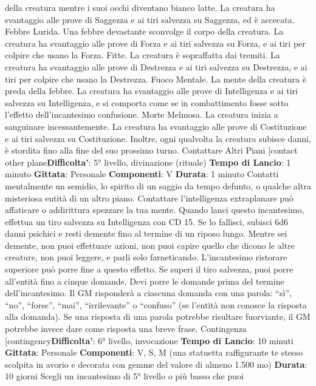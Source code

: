 \begin{multicols}{2}
della creatura mentre i suoi occhi diventano bianco
latte. La creatura ha svantaggio alle prove di Saggezza
e ai tiri salvezza su Saggezza, ed è accecata.
Febbre Lurida. Una febbre devastante sconvolge il
corpo della creatura. La creatura ha svantaggio alle
prove di Forza e ai tiri salvezza su Forza, e ai tiri per
colpire che usano la Forza.
Fitte. La creatura è sopraffatta dai tremiti. La creatura
ha svantaggio alle prove di Destrezza e ai tiri salvezza
su Destrezza, e ai tiri per colpire che usano la
Destrezza.
Fuoco Mentale. La mente della creatura è preda della
febbre. La creatura ha svantaggio alle prove di
Intelligenza e ai tiri salvezza su Intelligenza, e si
comporta come se in combattimento fosse sotto l’effetto
dell’incantesimo confusione.
Morte Melmosa. La creatura inizia a sanguinare
incessantemente. La creatura ha svantaggio alle prove
di Costituzione e ai tiri salvezza su Costituzione. Inoltre,
ogni qualvolta la creatura subisce danni, è stordita fino
alla fine del suo prossimo turno.
Contattare Altri Piani
[contact other plane\textbf{Difficolta'}:
5° livello, divinazione (rituale)
\textbf{Tempo di Lancio}: 1 minuto
\textbf{Gittata}: Personale
\textbf{Componenti}: V
\textbf{Durata}: 1 minuto
Contatti mentalmente un semidio, lo spirito di un saggio
da tempo defunto, o qualche altra misteriosa entità di
un altro piano. Contattare l’intelligenza extraplanare può
affaticare o addirittura spezzare la tua mente. Quando
lanci questo incantesimo, effettua un tiro salvezza su
Intelligenza con CD 15. Se lo fallisci, subisci 6d6 danni
psichici e resti demente fino al termine di un riposo
lungo. Mentre sei demente, non puoi effettuare azioni,
non puoi capire quello che dicono le altre creature, non
puoi leggere, e parli solo farneticando. L’incantesimo
ristorare superiore può porre fine a questo effetto.
Se superi il tiro salvezza, puoi porre all’entità fino a
cinque domande. Devi porre le domande prima del
termine dell’incantesimo. Il GM risponderà a ciascuna
domanda con una parola: “sì”, “no”, “forse”, “mai”,
“irrilevante” o “confuso” (se l’entità non conosce la
risposta alla domanda). Se una risposta di una parola
potrebbe risultare fuorviante, il GM potrebbe invece
dare come risposta una breve frase.
Contingenza
[contingency\textbf{Difficolta'}:
6° livello, invocazione
\textbf{Tempo di Lancio}: 10 minuti
\textbf{Gittata}: Personale
\textbf{Componenti}: V, S, M (una statuetta raffigurante te
stesso scolpita in avorio e decorata con gemme del
valore di almeno 1.500 mo)
\textbf{Durata}: 10 giorni
Scegli un incantesimo di 5° livello o più basso che puoi

\end{multicols}
